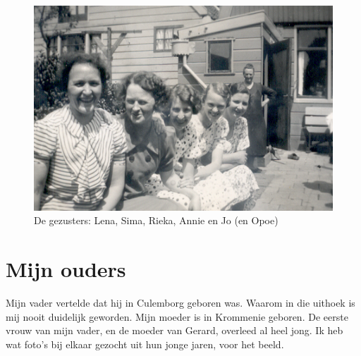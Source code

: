 \documentclass[12pt,twoside, openright]{memoir}
\begin{document}
\begin{figure}
\includegraphics[width=\textwidth]{img/ch3/Zussen}
\caption*{\footnotesize De gezusters: Lena, Sima, Rieka, Annie en Jo (en Opoe)}
\end{figure}

\chapter{Mijn ouders} %
\label{cha:ouders}

Mijn vader vertelde dat hij in Culemborg geboren was. Waarom in die uithoek is mij nooit duidelijk geworden. Mijn moeder is in Krommenie geboren. De eerste vrouw van mijn vader, en de moeder van Gerard, overleed al heel jong. Ik heb wat foto's bij elkaar gezocht uit hun jonge jaren, voor het beeld.
\end{document}
